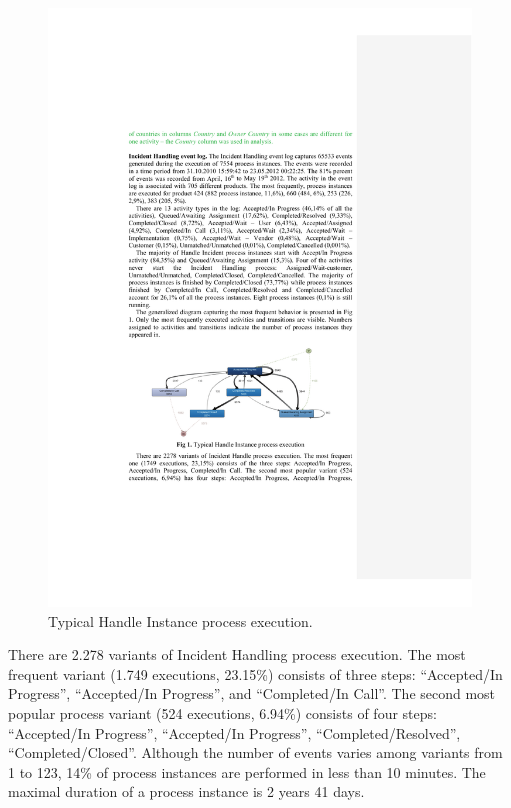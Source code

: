 \documentclass[lnbip]{svmultln}
\begin{document}
\begin{figure}
\centering
\includegraphics[width=\textwidth]{"figs/pic 1"}
\caption{Typical Handle Instance process execution.}
\label{fig:typicalHandleInstanceProcess}
\end{figure}
 
There are 2.278 variants of Incident Handling process execution. The most frequent variant (1.749 executions, 23.15\%) consists of three steps: ``Accepted/In Progress'', ``Accepted/In Progress'', and ``Completed/In Call''. The second most popular process variant (524 executions, 6.94\%) consists of four steps: ``Accepted/In Progress'', ``Accepted/In Progress'', ``Completed/Resolved'', ``Completed/Closed''. Although the number of events varies among variants from 1 to 123, 14\% of process instances are performed in less than 10 minutes. The maximal duration of a process instance is 2 years 41 days.
\end{document}
